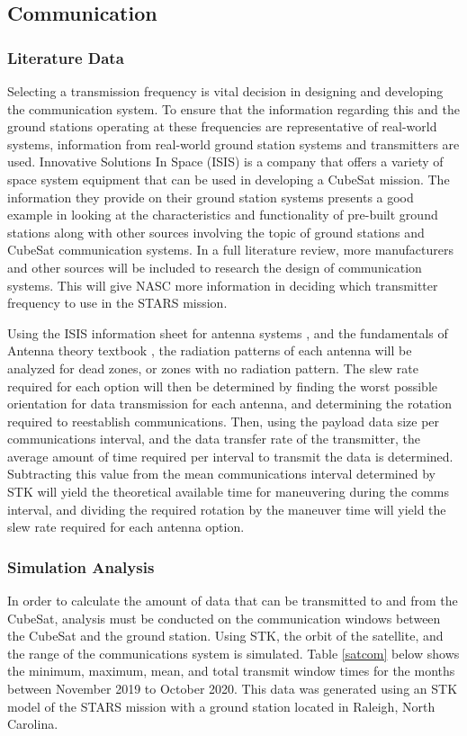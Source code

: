 \subsection{Communication}
\subsubsection{Literature Data}
Selecting a transmission frequency is vital decision in designing and developing the communication system. To ensure that the information regarding this and the ground stations operating at these frequencies are representative of real-world systems, information from real-world ground station systems and transmitters are used. Innovative Solutions In Space (ISIS) is a company that offers a variety of space system equipment that can be used in developing a CubeSat mission. The information they provide on their ground station systems \cite{isis_ground} presents a good example in looking at the characteristics and functionality of pre-built ground stations along with other sources involving the topic of ground stations and CubeSat communication systems. In a full literature review, more manufacturers and other sources will be included to research the design of communication systems. This will give NASC more information in deciding which transmitter frequency to use in the STARS mission. 

Using the ISIS information sheet for antenna systems \cite{shop}, and the fundamentals of Antenna theory textbook \cite{Wong}, the radiation patterns of each antenna will be analyzed for dead zones, or zones with no radiation pattern. The slew rate required for each option will then be determined by finding the worst possible orientation for data transmission for each antenna, and determining the rotation required to reestablish communications. Then, using the payload data size per communications interval, and the data transfer rate of the transmitter, the average amount of time required per interval to transmit the data is determined. Subtracting this value from the mean communications interval determined by STK will yield the theoretical available time for maneuvering during the comms interval, and dividing the required rotation by the maneuver time will yield the slew rate required for each antenna option.
\subsubsection{Simulation Analysis}
In order to calculate the amount of data that can be transmitted to and from the CubeSat, analysis must be conducted on the communication windows between the CubeSat and the ground station. Using STK, the orbit of the satellite, and the range of the communications system is simulated. Table \ref{satcom} below shows the minimum, maximum, mean, and total transmit window times for the months between November 2019 to October 2020. This data was generated using an STK model of the STARS mission with a ground station located in Raleigh, North Carolina. 

